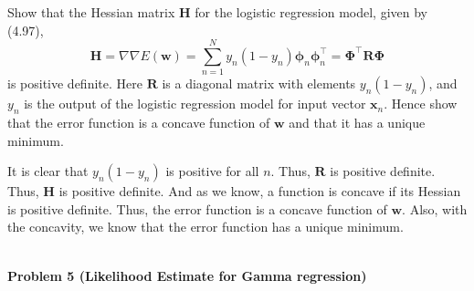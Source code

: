 \documentclass{article}
\begin{document}
Show  that  the  Hessian  matrix  $\mathbf{H}$  for  the  logistic  regression  model,  given  by  (4.97),  
\begin{equation}
    \mathbf{H} = \nabla\nabla E(\mathbf{w}) = \sum_{n=1}^N y_n(1-y_n)\mathbf{\phi}_n\mathbf{\phi}_n^\top = \mathbf{\Phi}^{\top} \mathbf{R}\mathbf{\Phi}
\end{equation}
is  positive definite.  Here  $\mathbf{R}$  is  a  diagonal  matrix  with  elements  $y_n(1-y_n)$,  and  $y_n$  is  the  output  of  the  logistic 
regression model for input vector  $\mathbf{x}_n$. Hence show that the error function is a concave function of $\mathbf{w}$ and 
that it has a unique minimum. 
\color{blue}
\begin{sol}
It is clear that $y_n(1-y_n)$ is positive for all $n$. Thus, $\mathbf{R}$ is positive definite. Thus, $\mathbf{H}$ is positive definite.
And as we know, a function is concave if its Hessian is positive definite. Thus, the error function is a concave function of $\mathbf{w}$.
Also, with the concavity, we know that the error function has a unique minimum.
\end{sol}
\color{black}
\leavevmode\\

\noindent
\Large{\textbf{Problem 5 (Likelihood Estimate for Gamma regression)}}\normalsize
\\
\end{document}
